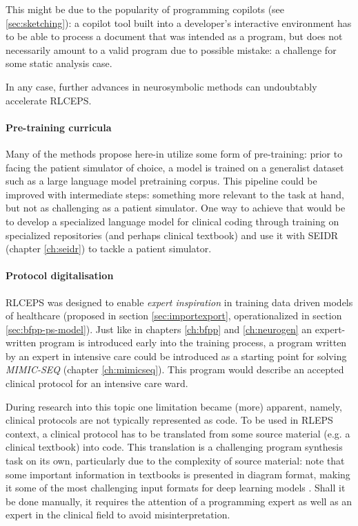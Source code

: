 This might be due to the popularity of programming copilots (see \ref{sec:sketching}): a copilot tool built into a developer's interactive environment has to be able to process a document that was intended as a program, but does not necessarily amount to a valid program due to possible mistake: a challenge for some static analysis case.

In any case, further advances in neurosymbolic methods can undoubtably accelerate RLCEPS.

\paragraph{Pre-training curricula}

Many of the methods propose here-in utilize some form of pre-training: prior to facing the patient simulator of choice, a model is trained on a generalist dataset such as a large language model pretraining corpus.
This pipeline could be improved with intermediate steps: something more relevant to the task at hand, but not as challenging as a patient simulator.
One way to achieve that would be to develop a specialized language model for clinical coding through training on specialized repositories (and perhaps clinical textbook) and use it with SEIDR (chapter \ref{ch:seidr}) to tackle a patient simulator.

\paragraph{Protocol digitalisation}

RLCEPS was designed to enable \emph{expert inspiration} in training data driven models of healthcare (proposed in section \ref{sec:importexport}, operationalized in section \ref{sec:bfpp-ps-model}).
Just like in chapters \ref{ch:bfpp} and \ref{ch:neurogen} an expert-written program is introduced early into the training process, a program written by an expert in intensive care could be introduced as a starting point for solving \emph{MIMIC-SEQ} (chapter \ref{ch:mimicseq}).
This program would describe an accepted clinical protocol for an intensive care ward.

During research into this topic one limitation became (more) apparent, namely, clinical protocols are not typically represented as code.
To be used in RLEPS context, a clinical protocol has to be translated from some source material (e.g. a clinical textbook) into code.
This translation is a challenging program synthesis task on its own, particularly due to the complexity of source material: note that some important information in textbooks is presented in diagram format, making it some of the most challenging input formats for deep learning models \cite{hauriletMoQAMultimodalQuestion2019, heTextbookQuestionAnswering2021, jamiesonDeepLearningText2020, jamiesonReviewDeepLearning2024, novakDiagramsTextComputer1993, shiinokiOvercomingVisionLanguage2025}.
Shall it be done manually, it requires the attention of a programming expert as well as an expert in the clinical field to avoid misinterpretation.


